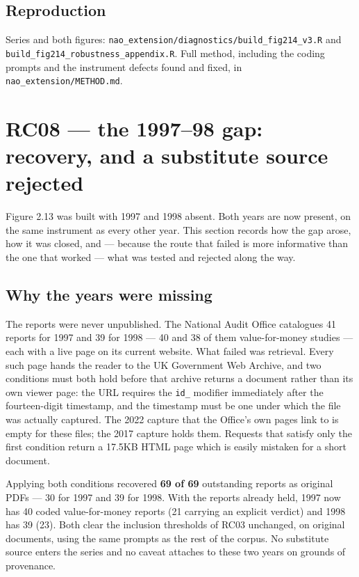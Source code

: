 \subsection*{Reproduction}

Series and both figures: \texttt{nao\_extension/diagnostics/build\_fig214\_v3.R} and
\texttt{build\_fig214\_robustness\_appendix.R}. Full method, including the coding prompts and the
instrument defects found and fixed, in \texttt{nao\_extension/METHOD.md}.

\section{RC08 --- the 1997--98 gap: recovery, and a substitute source rejected}

Figure 2.13 was built with 1997 and 1998 absent. Both years are now present, on the same
instrument as every other year. This section records how the gap arose, how it was closed, and
--- because the route that failed is more informative than the one that worked --- what was
tested and rejected along the way.

\subsection*{Why the years were missing}

The reports were never unpublished. The National Audit Office catalogues 41 reports for 1997 and
39 for 1998 --- 40 and 38 of them value-for-money studies --- each with a live page on its current
website. What failed was
retrieval. Every such page hands the reader to the UK Government Web Archive, and two conditions
must both hold before that archive returns a document rather than its own viewer page: the URL
requires the \texttt{id\_} modifier immediately after the fourteen-digit timestamp, and the
timestamp must be one under which the file was actually captured. The 2022 capture that the
Office's own pages link to is empty for these files; the 2017 capture holds them. Requests that
satisfy only the first condition return a 17.5KB HTML page which is easily mistaken for a short
document.

Applying both conditions recovered \textbf{69 of 69} outstanding reports as original PDFs --- 30 for
1997 and 39 for 1998. With the reports already held, 1997 now has 40 coded value-for-money reports
(21 carrying an explicit verdict) and 1998 has 39 (23). Both clear the inclusion thresholds of
RC03 unchanged, on original documents, using the same prompts as the rest of the corpus. No
substitute source enters the series and no caveat attaches to these two years on grounds of
provenance.

